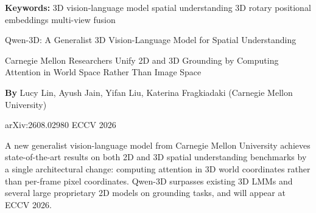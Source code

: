 \documentclass[10pt,twocolumn]{article}
\begin{document}
\setlength{\parindent}{0pt}
\setlength{\parskip}{4pt}

{\small\color{keywordgray}\textbf{Keywords:}
  3D vision-language model \textbullet{}
  spatial understanding \textbullet{}
  3D rotary positional embeddings \textbullet{}
  multi-view fusion}\par\vspace{4pt}

{\LARGE\bfseries\raggedright
  Qwen-3D: A Generalist 3D Vision-Language Model
  for Spatial Understanding}\par\vspace{4pt}

{\large\itshape\raggedright
  Carnegie Mellon Researchers Unify 2D and 3D Grounding
  by Computing Attention in World Space Rather Than Image Space}\par\vspace{6pt}

{\small\textbf{By} Lucy Lin, Ayush Jain, Yifan Liu,
  Katerina Fragkiadaki (Carnegie Mellon University)}\par\vspace{2pt}

{\small\color{keywordgray}arXiv:2608.02980 \textbullet{} ECCV 2026}
\par\vspace{2pt}\noindent{\color{rulered}\rule{\columnwidth}{0.6pt}}\vspace{6pt}

A new generalist vision-language model from Carnegie Mellon University achieves
state-of-the-art results on both 2D and 3D spatial understanding benchmarks by a
single architectural change: computing attention in 3D world coordinates rather than
per-frame pixel coordinates. Qwen-3D surpasses existing 3D LMMs and several large
proprietary 2D models on grounding tasks, and will appear at ECCV 2026.
\end{document}
